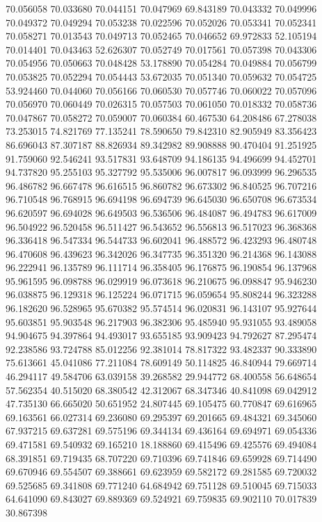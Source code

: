 70.056058
70.033680
70.044151
70.047969
69.843189
70.043332
70.049996
70.049372
70.049294
70.053238
70.022596
70.052026
70.053341
70.052341
70.058271
70.013543
70.049713
70.052465
70.046652
69.972833
52.105194
70.014401
70.043463
52.626307
70.052749
70.017561
70.057398
70.043306
70.054956
70.050663
70.048428
53.178890
70.054284
70.049884
70.056799
70.053825
70.052294
70.054443
53.672035
70.051340
70.059632
70.054725
53.924460
70.044060
70.056166
70.060530
70.057746
70.060022
70.057096
70.056970
70.060449
70.026315
70.057503
70.061050
70.018332
70.058736
70.047867
70.058272
70.059007
70.060384
60.467530
64.208486
67.278038
73.253015
74.821769
77.135241
78.590650
79.842310
82.905949
83.356423
86.696043
87.307187
88.826934
89.342982
89.908888
90.470404
91.251925
91.759060
92.546241
93.517831
93.648709
94.186135
94.496699
94.452701
94.737820
95.255103
95.327792
95.535006
96.007817
96.093999
96.296535
96.486782
96.667478
96.616515
96.860782
96.673302
96.840525
96.707216
96.710548
96.768915
96.694198
96.694739
96.645030
96.650708
96.673534
96.620597
96.694028
96.649503
96.536506
96.484087
96.494783
96.617009
96.504922
96.520458
96.511427
96.543652
96.556813
96.517023
96.368368
96.336418
96.547334
96.544733
96.602041
96.488572
96.423293
96.480748
96.470608
96.439623
96.342026
96.347735
96.351320
96.214368
96.143088
96.222941
96.135789
96.111714
96.358405
96.176875
96.190854
96.137968
95.961595
96.098788
96.029919
96.073618
96.210675
96.098847
95.946230
96.038875
96.129318
96.125224
96.071715
96.059654
95.808244
96.323288
96.182620
96.528965
95.670382
95.574514
96.020831
96.143107
95.927644
95.603851
95.903548
96.217903
96.382306
95.485940
95.931055
93.489058
94.904675
94.397864
94.493017
93.655185
93.909423
94.792627
87.295474
92.238586
93.724788
85.012256
92.381014
78.817322
93.482337
90.333890
75.613661
45.041086
77.211084
78.609149
50.114825
46.840944
79.669714
46.294117
49.584706
63.039158
39.268582
29.944772
68.400558
56.648654
57.562354
40.515020
68.380542
42.312067
68.347346
40.841098
69.042912
47.735130
66.665020
50.651952
24.807445
69.105475
60.770847
69.616965
69.163561
66.027314
69.236080
69.295397
69.201665
69.484321
69.345060
67.937215
69.637281
69.575196
69.344134
69.436164
69.694971
69.054336
69.471581
69.540932
69.165210
18.188860
69.415496
69.425576
69.494084
68.391851
69.719435
68.707220
69.710396
69.741846
69.659928
69.714490
69.670946
69.554507
69.388661
69.623959
69.582172
69.281585
69.720032
69.525685
69.341808
69.771240
64.684942
69.751128
69.510045
69.715033
64.641090
69.843027
69.889369
69.524921
69.759835
69.902110
70.017839
30.867398
